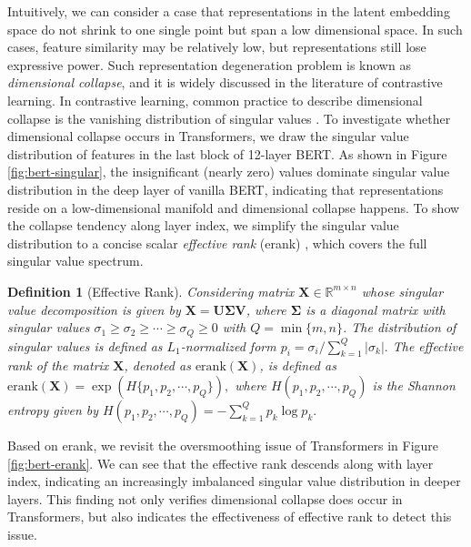 \documentclass{article}
\def\mU{{\bm{U}}}
\def\mV{{\bm{V}}}
\def\mX{{\bm{X}}}
\newcommand{\R}{\mathbb{R}}
\theoremstyle{definition}
\newtheorem{definition}{Definition}[section]
\theoremstyle{remark}
\theoremstyle{theorem}
\begin{document}
Intuitively, we can consider a case that representations in the latent embedding space do not shrink to one single point but span a low dimensional space. In such cases, feature similarity may be relatively low, but representations still lose expressive power. Such representation degeneration problem is known as \textit{dimensional collapse}, and it is 
widely discussed in the literature of contrastive learning. In contrastive learning, common practice to describe dimensional collapse is the vanishing distribution of singular values \citep{gao2019representation,ethayarajh2019contextual, jing2021understanding}. To investigate whether dimensional collapse occurs in Transformers, we draw the singular value distribution of features in the last block of 12-layer BERT. As shown in Figure \ref{fig:bert-singular}, the insignificant (nearly zero) values dominate singular value distribution in the deep layer of vanilla BERT, indicating that representations reside on a low-dimensional manifold and dimensional collapse happens. To show the collapse tendency along layer index, we simplify the singular value distribution to a concise scalar \textit{effective rank} (erank) \citep{roy2007effective}, which covers the full singular value spectrum. 

\begin{definition}[Effective Rank] \textit{Considering matrix $\mX \in \R^{m \times n}$ whose singular value decomposition is given by $\mX = \mU\mathbf{\Sigma}\mV$, where $\mathbf{\Sigma}$ is a diagonal matrix with singular values $\sigma_1 \geq \sigma_2 \geq \cdots \geq \sigma_Q \geq 0$ with $Q = \min\{m, n\}$. The distribution of singular values is defined as $L_1$-normalized form
$p_i = \sigma_i/\sum_{k=1}^{Q} {\vert \sigma_k \vert}.$
The effective rank of the matrix $\mX$, denoted as $\mbox{erank}(\mX)$, is defined as
$\mbox{erank}(\mX) = \exp (H\{p_1, p_2, \cdots, p_Q\}),$
where $H(p_1, p_2, \cdots, p_Q)$ is the Shannon entropy given by
$H(p_1, p_2, \cdots, p_Q) = -\sum_{k=1}^Q p_k \log p_k.$}
\end{definition}

Based on erank, we revisit the oversmoothing issue of Transformers in Figure \ref{fig:bert-erank}. We can see that the effective rank descends along with layer index, indicating an increasingly imbalanced singular value distribution in deeper layers. This finding not only verifies dimensional collapse does occur in Transformers, but also indicates the effectiveness of effective rank to detect this issue.
\end{document}
